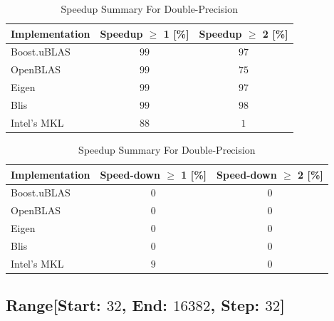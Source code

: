 \begin{table}[ht]
    \centering
    \caption{Speedup Summary For Double-Precision}
    \begin{tabular}{|l|c|c|}
        \hline
        \textbf{Implementation} & \textbf{Speedup $\geq$ 1 [\%]} & \textbf{Speedup $\geq$ 2 [\%]}\\
        \hline
        Boost.uBLAS & $99$ & $97$ \\
        \hline
        OpenBLAS    & $99$ & $75$ \\
        \hline
        Eigen       & $99$ & $97$ \\
        \hline
        Blis        & $99$ & $98$ \\
        \hline
        Intel's MKL & $88$ & $1$ \\
        \hline
    \end{tabular}
    \newline
    \vspace*{1 cm}
    \newline
    \begin{tabular}{|l|c|c|}
        \hline
        \textbf{Implementation} & \textbf{Speed-down $\geq$ 1 [\%]} & \textbf{Speed-down $\geq$ 2 [\%]}\\
        \hline
        Boost.uBLAS & $0$ & $0$ \\
        \hline
        OpenBLAS    & $0$ & $0$ \\
        \hline
        Eigen       & $0$ & $0$ \\
        \hline
        Blis        & $0$ & $0$ \\
        \hline
        Intel's MKL & $9$ & $0$ \\
        \hline
    \end{tabular}
\end{table}

\newpage
\subsection{Range[Start: $32$, End: $16382$, Step: $32$]}

